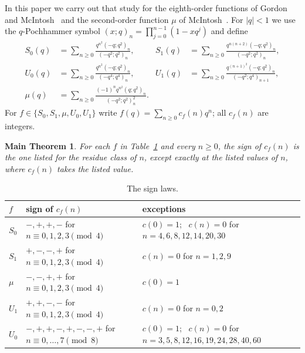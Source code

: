 \documentclass[11pt]{amsart}
\newtheorem*{mainthm}{Main Theorem}
\theoremstyle{definition}
\theoremstyle{remark}
\numberwithin{equation}{section}
\begin{document}
In this paper we carry out that study for the eighth-order functions of Gordon and McIntosh~\cite{GM} and the second-order function $\mu$ of McIntosh~\cite{Mc}.
For $|q|<1$ we use the $q$-Pochhammer symbol $(x;q)_n=\prod_{j=0}^{n-1}(1-xq^j)$ and define
\begin{align}
S_0(q)&=\sum_{n\ge0}\frac{q^{n^2}(-q;q^2)_n}{(-q^2;q^2)_n}, &
S_1(q)&=\sum_{n\ge0}\frac{q^{n(n+2)}(-q;q^2)_n}{(-q^2;q^2)_n}, \label{eq:S}\\
U_0(q)&=\sum_{n\ge0}\frac{q^{n^2}(-q;q^2)_n}{(-q^4;q^4)_n}, &
U_1(q)&=\sum_{n\ge0}\frac{q^{(n+1)^2}(-q;q^2)_n}{(-q^2;q^4)_{n+1}}, \label{eq:U}\\
\mu(q)&=\sum_{n\ge0}\frac{(-1)^nq^{n^2}(q;q^2)_n}{(-q^2;q^2)_n^2}. \label{eq:mu}
\end{align}
For $f\in\{S_0,S_1,\mu,U_0,U_1\}$ write $f(q)=\sum_{n\ge0}c_f(n)q^n$; all $c_f(n)$ are integers.

\begin{mainthm}
For each $f$ in Table~\ref{tab:main} and every $n\ge0$, the sign of $c_f(n)$ is the one listed for the residue class of $n$, except exactly at the listed values of $n$, where $c_f(n)$ takes the listed value.
\end{mainthm}

\begin{table}[ht]
\centering
\renewcommand{\arraystretch}{1.25}
\small
\begin{tabular}{@{}l>{\raggedright\arraybackslash}p{4.9cm}>{\raggedright\arraybackslash}p{5.4cm}@{}}
\toprule
$f$ & sign of $c_f(n)$ & exceptions \\
\midrule
$S_0$ & $-,+,+,-$ for $n\equiv 0,1,2,3 \pmod 4$ & $c(0)=1$; \ $c(n)=0$ for $n=4,6,8,12,14,20,30$\\
$S_1$ & $+,-,-,+$ for $n\equiv 0,1,2,3 \pmod 4$ & $c(n)=0$ for $n=1,2,9$\\
$\mu$ & $-,-,+,+$ for $n\equiv 0,1,2,3 \pmod 4$ & $c(0)=1$\\
$U_1$ & $+,+,-,-$ for $n\equiv 0,1,2,3 \pmod 4$ & $c(n)=0$ for $n=0,2$\\
$U_0$ & $-,+,+,-,+,-,-,+$ for $n\equiv 0,\dots,7 \pmod 8$ & $c(0)=1$; \ $c(n)=0$ for $n=3,5,8,12,16,19,24,28,40,60$\\
\bottomrule
\end{tabular}
\caption{The sign laws.}\label{tab:main}
\end{table}
\end{document}
